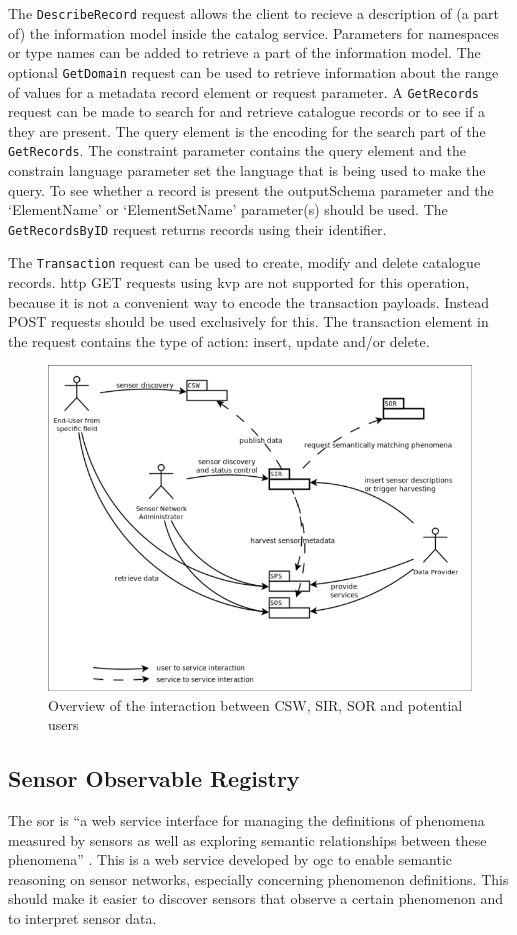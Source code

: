 The \texttt{DescribeRecord} request allows the client to recieve a description of (a part of) the information model inside the catalog service. Parameters for namespaces or type names can be added to retrieve a part of the information model. The optional \texttt{GetDomain} request can be used to retrieve information about the range of values for a metadata record element or request parameter. A \texttt{GetRecords} request can be made to search for and retrieve catalogue records or to see if a they are present. The query element is the encoding for the search part of the \texttt{GetRecords}. The constraint parameter contains the query element and the constrain language parameter set the language that is being used to make the query. To see whether a record is present the outputSchema parameter and the `ElementName' or `ElementSetName' parameter(s) should be used. The \texttt{GetRecordsByID} request returns records using their identifier.

The \texttt{Transaction} request can be used to create, modify and delete catalogue records. \ac{http} GET requests using \ac{kvp} are not supported for this operation, because it is not a convenient way to encode the transaction payloads. Instead POST requests should be used exclusively for this. The transaction element in the request contains the type of action: insert, update and/or delete. 

\begin{figure}
	\centering
	\includegraphics[width=0.8\linewidth]{figs/sor_sir.png}
	\caption{Overview of the interaction between CSW, SIR, SOR and potential users \citep{SW:52North2}}
	\label{fig:SorSir}
\end{figure}

\subsection{Sensor Observable Registry}
The \ac{sor} is \enquote{a web service interface for managing the definitions of phenomena measured by sensors as well as exploring semantic relationships between these phenomena} \cite[p. vi]{SW:OGC4}. This is a web service developed by \ac{ogc} to enable semantic reasoning on sensor networks, especially concerning phenomenon definitions. This should make it easier to discover sensors that observe a certain phenomenon and to interpret sensor data.

